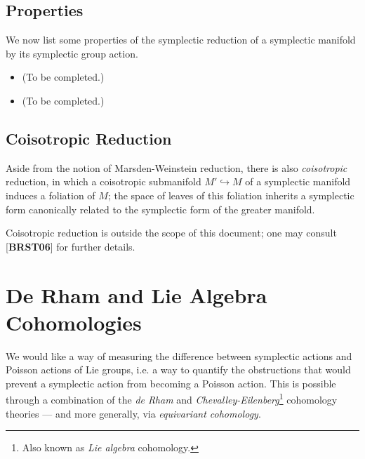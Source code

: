 \documentclass{tufte-handout}
\begin{document}
\subsection{Properties}
We now list some properties of the symplectic reduction of a symplectic manifold by its symplectic group action.

\begin{itemize}
\item (To be completed.) %

\item (To be completed.) %
\end{itemize}

\subsection{Coisotropic Reduction}
Aside from the notion of Marsden-Weinstein reduction, there is also \emph{coisotropic} reduction, in which a coisotropic submanifold $M' \hookrightarrow M$ of a symplectic manifold induces a foliation of $M$; the space of leaves of this foliation inherits a symplectic form canonically related to the symplectic form of the greater manifold.

Coisotropic reduction is outside the scope of this document; one may consult [\textbf{BRST06}] for further details. %

\section{De Rham and Lie Algebra Cohomologies}
We would like a way of measuring the difference between symplectic actions and Poisson actions of Lie groups, i.e. a way to quantify the obstructions that would prevent a symplectic action from becoming a Poisson action. This is possible through a combination of the \emph{de Rham} and \emph{Chevalley-Eilenberg}\footnote{Also known as \emph{Lie algebra} cohomology.} cohomology theories --- and more generally, via \emph{equivariant cohomology}.
\end{document}
